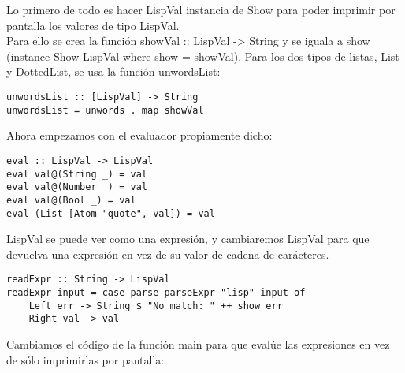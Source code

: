Lo primero de todo es hacer LispVal instancia de Show para poder imprimir por pantalla los valores de tipo LispVal.\\

Para ello se crea la funci\'on showVal :: LispVal -> String y se iguala a show (instance Show LispVal where show = showVal). Para los dos tipos de listas, List y DottedList, se usa la funci\'on unwordsList:\\

\begin{minipage}{\linewidth}
\begin{small}
\begin{lstlisting}[frame=single]
unwordsList :: [LispVal] -> String
unwordsList = unwords . map showVal
\end{lstlisting}
\end{small}
\end{minipage}

Ahora empezamos con el evaluador propiamente dicho:\\

\begin{minipage}{\linewidth}
\begin{small}
\begin{lstlisting}[frame=single]
eval :: LispVal -> LispVal
eval val@(String _) = val
eval val@(Number _) = val
eval val@(Bool _) = val
eval (List [Atom "quote", val]) = val
\end{lstlisting}
\end{small}
\end{minipage}

LispVal se puede ver como una expresi\'on, y cambiaremos LispVal para que devuelva una expresi\'on en vez de su valor de cadena de car\'acteres.\\

\begin{minipage}{\linewidth}
\begin{small}
\begin{lstlisting}[frame=single]
readExpr :: String -> LispVal
readExpr input = case parse parseExpr "lisp" input of
    Left err -> String $ "No match: " ++ show err
    Right val -> val
\end{lstlisting}
\end{small}
\end{minipage}

Cambiamos el c\'odigo de la funci\'on main para que eval\'ue las expresiones en vez de s\'olo imprimirlas por pantalla:\\

